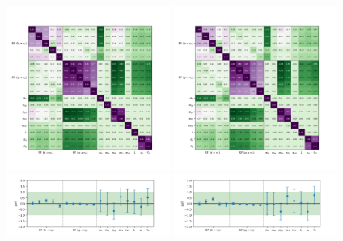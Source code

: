\begin{frame}{}
\smaller
    \begin{center}
    \includegraphics[width=0.4\textwidth]{chapters/Analysis/sectionCalibration/figures/jetToTauh/corr2_lltauTight_splitJetFlavor.png}
    \includegraphics[width=0.4\textwidth]{chapters/Analysis/sectionCalibration/figures/jetToTauh/corr2_lltauVTight_splitJetFlavor.png}
    \includegraphics[width=0.4\textwidth]{chapters/Analysis/sectionCalibration/figures/jetToTauh/pull2_lltauTight_splitJetFlavor.png}
    \includegraphics[width=0.4\textwidth]{chapters/Analysis/sectionCalibration/figures/jetToTauh/pull2_lltauVTight_splitJetFlavor.png}
    \end{center}
\end{frame}


